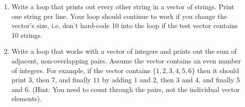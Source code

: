 \documentclass[10pt]{article}
\begin{document}
\begin{enumerate}
\item Write a loop that prints out every other string in a vector of strings.  Print one string per line. Your loop should continue to work if you change the vector's size, i.e. don't hard-code 10 into the loop if the test vector contains 10 strings.

\item Write a loop that works with a vector of integers and prints out the sum of adjacent, non-overlapping pairs. Assume the vector contains an even number of integers. For example, if the vector contains $\{1,2,3,4,5,6\}$ then it should print $3$, then $7$, and finally $11$ by adding $1$ and $2$, then $3$ and $4$, and finally $5$ and $6$. (Hint: You need to count through the pairs, not the individual vector elements).

\end{enumerate}
\end{document}

